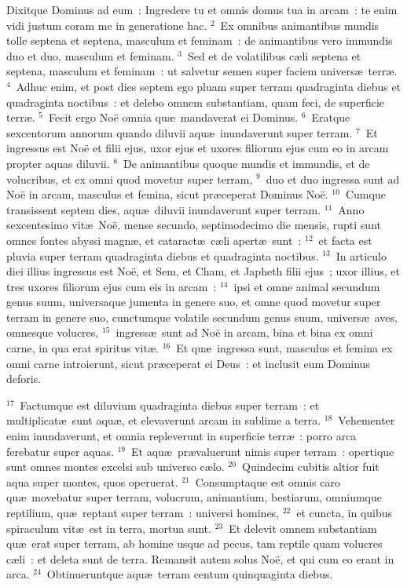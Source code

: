 \lettrine[lines=3,image=true,loversize=0.05,lraise=-0.03]{D}{}ixitque Dominus ad eum~: Ingredere tu et omnis domus tua in arcam~: te enim vidi justum coram me in generatione hac.
${}^{2}$~Ex omnibus animantibus mundis tolle septena et septena, masculum et feminam~: de animantibus vero immundis duo et duo, masculum et feminam.
${}^{3}$~Sed et de volatilibus c\ae li septena et septena, masculum et feminam~: ut salvetur semen super faciem univers\ae\ terr\ae .
${}^{4}$~Adhuc enim, et post dies septem ego pluam super terram quadraginta diebus et quadraginta noctibus~: et delebo omnem substantiam, quam feci, de superficie terr\ae .
${}^{5}$~Fecit ergo No\"e omnia qu\ae\ mandaverat ei Dominus.
${}^{6}$~Eratque sexcentorum annorum quando diluvii aqu\ae\ inundaverunt super terram.
${}^{7}$~Et ingressus est No\"e et filii ejus, uxor ejus et uxores filiorum ejus cum eo in arcam propter aquas diluvii.
${}^{8}$~De animantibus quoque mundis et immundis, et de volucribus, et ex omni quod movetur super terram,
${}^{9}$~duo et duo ingressa sunt ad No\"e in arcam, masculus et femina, sicut pr\ae ceperat Dominus No\"e.
${}^{10}$~Cumque transissent septem dies, aqu\ae\ diluvii inundaverunt super terram.
${}^{11}$~Anno sexcentesimo vit\ae\ No\"e, mense secundo, septimodecimo die mensis, rupti sunt omnes fontes abyssi magn\ae , et cataract\ae\ c\ae li apert\ae\ sunt~:
${}^{12}$~et facta est pluvia super terram quadraginta diebus et quadraginta noctibus.
${}^{13}$~In articulo diei illius ingressus est No\"e, et Sem, et Cham, et Japheth filii ejus~; uxor illius, et tres uxores filiorum ejus cum eis in arcam~:
${}^{14}$~ipsi et omne animal secundum genus suum, universaque jumenta in genere suo, et omne quod movetur super terram in genere suo, cunctumque volatile secundum genus suum, univers\ae\ aves, omnesque volucres,
${}^{15}$~ingress\ae\ sunt ad No\"e in arcam, bina et bina ex omni carne, in qua erat spiritus vit\ae .
${}^{16}$~Et qu\ae\ ingressa sunt, masculus et femina ex omni carne introierunt, sicut pr\ae ceperat ei Deus~: et inclusit eum Dominus deforis.


${}^{17}$~Factumque est diluvium quadraginta diebus super terram~: et multiplicat\ae\ sunt aqu\ae , et elevaverunt arcam in sublime a terra.
${}^{18}$~Vehementer enim inundaverunt, et omnia repleverunt in superficie terr\ae~: porro arca ferebatur super aquas.
${}^{19}$~Et aqu\ae\ pr\ae valuerunt nimis super terram~: opertique sunt omnes montes excelsi sub universo c\ae lo.
${}^{20}$~Quindecim cubitis altior fuit aqua super montes, quos operuerat.
${}^{21}$~Consumptaque est omnis caro qu\ae\ movebatur super terram, volucrum, animantium, bestiarum, omniumque reptilium, qu\ae\ reptant super terram~: universi homines,
${}^{22}$~et cuncta, in quibus spiraculum vit\ae\ est in terra, mortua sunt.
${}^{23}$~Et delevit omnem substantiam qu\ae\ erat super terram, ab homine usque ad pecus, tam reptile quam volucres c\ae li~: et deleta sunt de terra. Remansit autem solus No\"e, et qui cum eo erant in arca.
${}^{24}$~Obtinueruntque aqu\ae\ terram centum quinquaginta diebus.

